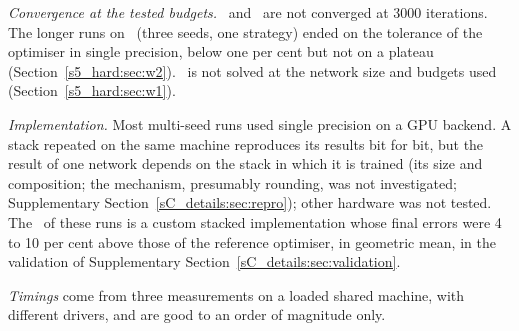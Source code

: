 \emph{Convergence at the tested budgets.} \PWtwo\ and \PLthree\ are not converged at 3000 iterations.
The longer runs on \PWtwo\ (three seeds, one strategy) ended on the tolerance of the
optimiser in single precision, below one per cent but not on a plateau
(Section~\ref{s5_hard:sec:w2}). \PWone\ is not solved at the network size and budgets
used (Section~\ref{s5_hard:sec:w1}).

\emph{Implementation.} Most multi-seed runs used single precision on a GPU backend. A stack
repeated on the same machine reproduces its results bit for bit, but the result of one
network depends on the stack in which it is trained (its size and composition; the mechanism,
presumably rounding, was not investigated; Supplementary Section~\ref{sC_details:sec:repro}); other hardware was not tested. The \LBFGS\ of these runs
is a custom stacked implementation whose final errors were 4 to 10 per cent above those of the
reference optimiser, in geometric mean, in the validation of
Supplementary Section~\ref{sC_details:sec:validation}.

\emph{Timings} come from three measurements on a loaded shared machine, with different
drivers, and are good to an order of magnitude only.

